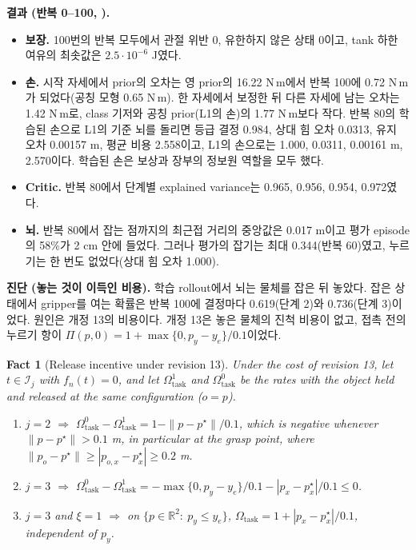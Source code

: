 \documentclass[11pt]{article}\usepackage[margin=1in]{geometry}\usepackage{amsmath,amssymb,amsthm,mathtools}\usepackage{graphicx}\graphicspath{{figures/}{../figures/}{figs/}{./}}\usepackage{enumitem}\usepackage{hyperref}\usepackage{cleveref}\usepackage{tikz}\usetikzlibrary{arrows.meta,positioning,calc,shapes.geometric}\usepackage{float}\usepackage{rotating}\usepackage[most]{tcolorbox}\usepackage{kotex}\usepackage{booktabs}\usepackage{longtable}\emergencystretch=1.6em\tolerance=2000 \crefname{assumption}{Assumption}{Assumptions}\Crefname{assumption}{Assumption}{Assumptions}\crefname{definition}{Definition}{Definitions}\Crefname{definition}{Definition}{Definitions}\crefname{proposition}{Proposition}{Propositions}\Crefname{proposition}{Proposition}{Propositions}\crefname{fact}{Fact}{Facts}\Crefname{fact}{Fact}{Facts} \newtheorem{assumption}{Assumption}\newtheorem{definition}{Definition}\newtheorem{lemma}{Lemma}\newtheorem{proposition}{Proposition}\newtheorem{theorem}{Theorem}\newtheorem{corollary}{Corollary}\newtheorem{fact}{Fact}\theoremstyle{remark}\newtheorem{remark}{Remark} \newcommand{\R}{\mathbb{R}}\newcommand{\xb}{\bar x}\newcommand{\Ab}{\bar A}\newcommand{\By}{\bar B_y}\newcommand{\U}{\mathcal U}\newcommand{\Z}{\mathcal Z}
\begin{document}
\textbf{결과 (반복 0--100, ).}
\begin{itemize}
\item \textbf{보장.} 100번의 반복 모두에서 관절 위반 0, 유한하지 않은 상태 0이고, tank 하한 여유의 최솟값은 $2.5\cdot10^{-6}$ J였다.
\item \textbf{손.} 시작 자세에서 prior의 오차는 영 prior의 16.22 N\,m에서 반복 100에 0.72 N\,m가 되었다(공칭 모형 0.65 N\,m). 한 자세에서 보정한 뒤 다른 자세에 남는 오차는 1.42 N\,m로, class 기저와 공칭 prior(L1의 손)의 1.77 N\,m보다 작다. 반복 80의 학습된 손으로 L1의 기준 뇌를 돌리면 등급 결정 0.984, 상대 힘 오차 0.0313, 유지 오차 0.00157 m, 평균 비용 2.558이고, L1의 손으로는 1.000, 0.0311, 0.00161 m, 2.570이다. 학습된 손은 보상과 장부의 정보원 역할을 모두 했다.
\item \textbf{Critic.} 반복 80에서 단계별 explained variance는 0.965, 0.956, 0.954, 0.972였다.
\item \textbf{뇌.} 반복 80에서 잡는 점까지의 최근접 거리의 중앙값은 0.017 m이고 평가 episode의 58\%가 2 cm 안에 들었다. 그러나 평가의 잡기는 최대 0.344(반복 60)였고, 누르기는 한 번도 없었다(상대 힘 오차 1.000).
\end{itemize}

\textbf{진단 (놓는 것이 이득인 비용).} 학습 rollout에서 뇌는 물체를 잡은 뒤 놓았다. 잡은 상태에서 gripper를 여는 확률은 반복 100에 결정마다 0.619(단계 2)와 0.736(단계 3)이었다. 원인은 개정 13의 비용이다. 개정 13은 놓은 물체의 진척 비용이 없고, 접촉 전의 누르기 항이 $\Pi(p,0)=1+\max\{0,p_y-y_e\}/0.1$이었다.

\begin{fact}[Release incentive under revision 13]
\label{fact:release13}
Under the cost of revision 13, let $t\in\mathcal I_j$ with $f_n(t)=0$, and let $\Omega^1_{\mathrm{task}}$ and $\Omega^0_{\mathrm{task}}$ be the rates with the object held and released at the same configuration ($o=p$).
\begin{enumerate}[label=(\alph*)]
\item $j=2$ $\Rightarrow$ $\Omega^0_{\mathrm{task}}-\Omega^1_{\mathrm{task}}=1-\|p-p^\star\|/0.1$, which is negative whenever $\|p-p^\star\|>0.1$ m, in particular at the grasp point, where $\|p_o-p^\star\|\ge|p_{o,x}-p^\star_x|\ge0.2$ m.
\item $j=3$ $\Rightarrow$ $\Omega^0_{\mathrm{task}}-\Omega^1_{\mathrm{task}}=-\max\{0,p_y-y_e\}/0.1-|p_x-p^\star_x|/0.1\le0$.
\item $j=3$ and $\xi=1$ $\Rightarrow$ on $\{p\in\R^2:\ p_y\le y_e\}$, $\Omega_{\mathrm{task}}=1+|p_x-p^\star_x|/0.1$, independent of $p_y$.
\end{enumerate}
\end{fact}
\end{document}
